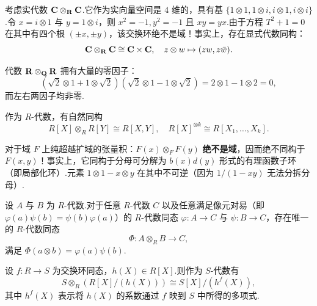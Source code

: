 \begin{example}\label{ex:c-tensor-c}
考虑实代数 $\mathbf{C} \otimes_{\mathbf{R}} \mathbf{C}$.它作为实向量空间是 $4$ 维的，具有基 $\{1 \otimes 1, 1 \otimes i, i \otimes 1, i \otimes i\}$.令 $x = i \otimes 1$ 与 $y = 1 \otimes i$，则 $x^2 = -1, y^2 = -1$ 且 $xy = yx$.由于方程 $T^2 + 1 = 0$ 在其中有四个根 $(\pm x, \pm y)$，该交换环绝不是域！事实上，存在显式代数同构：
\[
  \mathbf{C} \otimes_{\mathbf{R}} \mathbf{C} \cong \mathbf{C} \times \mathbf{C}, \quad z \otimes w \mapsto (zw, z\bar{w}).
\]
\end{example}

\begin{example}\label{ex:r-tensor-q-r-zero-divisors}
代数 $\mathbf{R} \otimes_{\mathbf{Q}} \mathbf{R}$ 拥有大量的零因子：
\[
  (\sqrt{2} \otimes 1 + 1 \otimes \sqrt{2})(\sqrt{2} \otimes 1 - 1 \otimes \sqrt{2}) = 2 \otimes 1 - 1 \otimes 2 = 0,
\]
而左右两因子均非零.
\end{example}

\begin{example}\label{ex:poly-tensor-algebra}
作为 $R$-代数，有自然同构
\[
  R[X] \otimes_R R[Y] \cong R[X, Y], \quad R[X]^{\otimes k} \cong R[X_1, \dots, X_k].
\]
\end{example}

\begin{example}\label{ex:rational-function-field-tensor}
对于域 $F$ 上纯超越扩域的张量积：$F(x) \otimes_F F(y)$ \textbf{绝不是域}，因而绝不同构于 $F(x, y)$！事实上，它同构于分母可分解为 $b(x)d(y)$ 形式的有理函数子环（即局部化环）.元素 $1 \otimes 1 - x \otimes y$ 在其中不可逆（因为 $1/(1-xy)$ 无法分拆分母）.
\end{example}

\begin{theorem}[代数张量积的普遍映射性质]\label{thm:algebra-tensor-ump}
设 $A$ 与 $B$ 为 $R$-代数.对于任意 $R$-代数 $C$ 以及任意满足像元对易（即 $\varphi(a)\psi(b) = \psi(b)\varphi(a)$）的 $R$-代数同态 $\varphi \colon A \to C$ 与 $\psi \colon B \to C$，存在唯一的 $R$-代数同态
\[
  \Phi \colon A \otimes_R B \to C,
\]
满足 $\Phi(a \otimes b) = \varphi(a)\psi(b)$.
\end{theorem}

\begin{theorem}[多项式代数商环的基变换]\label{thm:poly-quotient-algebra-base-ext}
设 $f \colon R \to S$ 为交换环同态，$h(X) \in R[X]$.则作为 $S$-代数有
\begin{equation}
  S \otimes_R (R[X]/(h(X))) \cong S[X]/(h^f(X)),
\end{equation}
其中 $h^f(X)$ 表示将 $h(X)$ 的系数通过 $f$ 映到 $S$ 中所得的多项式.
\end{theorem}

